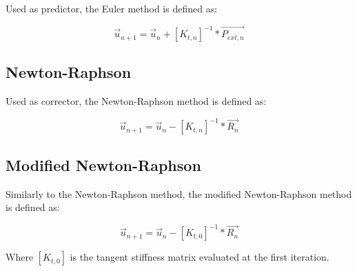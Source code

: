 Used as predictor, the Euler method is defined as:

\begin{equation}
    {\vec{u}_{n+1}} = {\vec{u}_n} + [K_{t,n}]^{-1} * {\vec{P_{ext,n}}}
    \label{eq:euler_method}
\end{equation}


\subsection{Newton-Raphson}

Used as corrector, the Newton-Raphson method is defined as:

\begin{equation}
    {\vec{u}_{n+1}} = {\vec{u}_n} - [K_{t,n}]^{-1} * {\vec{R_n}}
    \label{eq:newton_raphson_method}
\end{equation}

\subsection{Modified Newton-Raphson}

Similarly to the Newton-Raphson method, the modified Newton-Raphson method is defined as:

\begin{equation}
    {\vec{u}_{n+1}} = {\vec{u}_n} - [K_{t,0}]^{-1} * {\vec{R_n}}
    \label{eq:modified_newton_raphson_method}
\end{equation}

Where $[K_{t,0}]$ is the tangent stiffness matrix evaluated at the first iteration.
